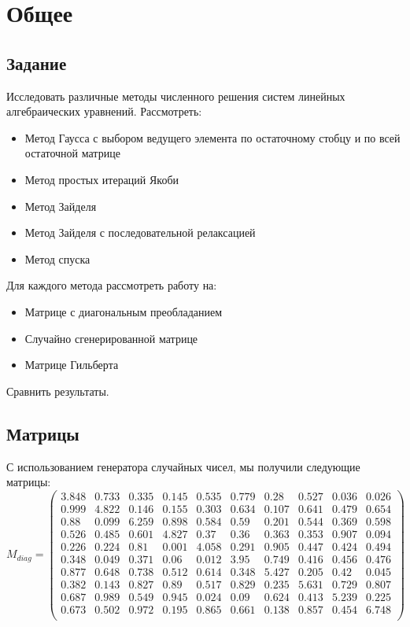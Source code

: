 \documentclass[../../report.tex]{subfiles}
\begin{document}
\chapter{Общее}

\section{Задание}
    Исследовать различные методы численного решения систем линейных алгебраических уравнений.
    Рассмотреть: 
    \begin{itemize}
        \item Метод Гаусса с выбором ведущего элемента по остаточному стобцу и по всей остаточной матрице
        \item Метод простых итераций Якоби
        \item Метод Зайделя
        \item Метод Зайделя с последовательной релаксацией
        \item Метод спуска
    \end{itemize}

    Для каждого метода рассмотреть работу на:
    \begin{itemize}
        \item Матрице с диагональным преобладанием
        \item Случайно сгенерированной матрице
        \item Матрице Гильберта
    \end{itemize}
    Сравнить результаты.

\section{Матрицы}
    С использованием генератора случайных чисел, мы получили следующие матрицы:
\[
    M_{diag} = 
    \begin{pmatrix}
        3.848 & 0.733 & 0.335 & 0.145 & 0.535 & 0.779 & 0.28  & 0.527 & 0.036 & 0.026 \\
        0.999 & 4.822 & 0.146 & 0.155 & 0.303 & 0.634 & 0.107 & 0.641 & 0.479 & 0.654 \\
        0.88  & 0.099 & 6.259 & 0.898 & 0.584 & 0.59  & 0.201 & 0.544 & 0.369 & 0.598 \\
        0.526 & 0.485 & 0.601 & 4.827 & 0.37  & 0.36  & 0.363 & 0.353 & 0.907 & 0.094 \\
        0.226 & 0.224 & 0.81  & 0.001 & 4.058 & 0.291 & 0.905 & 0.447 & 0.424 & 0.494 \\
        0.348 & 0.049 & 0.371 & 0.06  & 0.012 & 3.95  & 0.749 & 0.416 & 0.456 & 0.476 \\
        0.877 & 0.648 & 0.738 & 0.512 & 0.614 & 0.348 & 5.427 & 0.205 & 0.42  & 0.045 \\
        0.382 & 0.143 & 0.827 & 0.89  & 0.517 & 0.829 & 0.235 & 5.631 & 0.729 & 0.807 \\
        0.687 & 0.989 & 0.549 & 0.945 & 0.024 & 0.09  & 0.624 & 0.413 & 5.239 & 0.225 \\
        0.673 & 0.502 & 0.972 & 0.195 & 0.865 & 0.661 & 0.138 & 0.857 & 0.454 & 6.748 \\

    \end{pmatrix}
\] 
\end{document}

